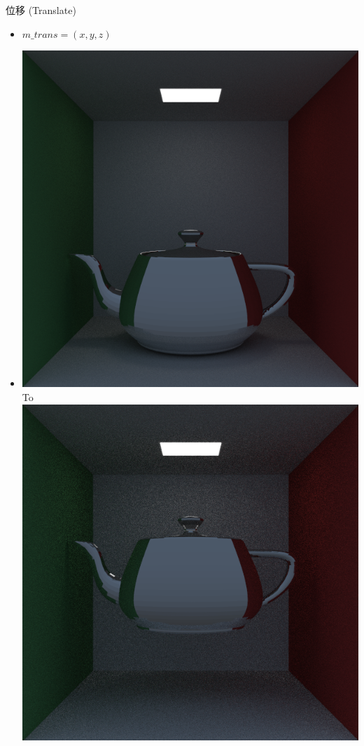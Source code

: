 \documentclass{beamer}
\begin{document}
\begin{frame} {位移 (Translate)}
		\begin{itemize}
\item $m\_trans = (x, y, z) $
\item \includegraphics[scale=0.2]{cornellbox_teapot_common} To 
\includegraphics[scale=0.2]{cornellbox_teapot_translate}
\end{itemize}
\end{frame}
\end{document}
